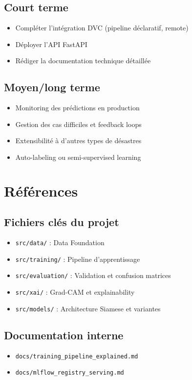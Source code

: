 \documentclass[12pt,a4paper]{article}
\begin{document}
\subsection{Court terme}
\begin{itemize}
    \item Compléter l'intégration DVC (pipeline déclaratif, remote)
    \item Déployer l'API FastAPI
    \item Rédiger la documentation technique détaillée
\end{itemize}

\subsection{Moyen/long terme}
\begin{itemize}
    \item Monitoring des prédictions en production
    \item Gestion des cas difficiles et feedback loops
    \item Extensibilité à d'autres types de désastres
    \item Auto-labeling ou semi-supervised learning
\end{itemize}

\newpage

\section{Références}

\subsection{Fichiers clés du projet}
\begin{itemize}
    \item \texttt{src/data/} : Data Foundation
    \item \texttt{src/training/} : Pipeline d'apprentissage
    \item \texttt{src/evaluation/} : Validation et confusion matrices
    \item \texttt{src/xai/} : Grad-CAM et explainability
    \item \texttt{src/models/} : Architecture Siamese et variantes
\end{itemize}

\subsection{Documentation interne}
\begin{itemize}
    \item \texttt{docs/training\_pipeline\_explained.md}
    \item \texttt{docs/mlflow\_registry\_serving.md}
\end{itemize}
\end{document}
